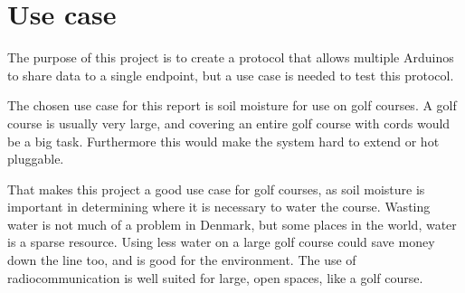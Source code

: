\section{Use case}
The purpose of this project is to create a protocol that allows multiple Arduinos to share data to a single endpoint, but a use case is needed to test this protocol.

The chosen use case for this report is soil moisture for use on golf courses. A golf course is usually very large, and covering an entire golf course with cords would be a big task. Furthermore this would make the system hard to extend or hot pluggable.

That makes this project a good use case for golf courses, as soil moisture is important in determining where it is necessary to water the course. Wasting water is not much of a problem in Denmark, but some places in the world, water is a sparse resource. Using less water on a large golf course could save money down the line too, and is good for the environment. The use of radiocommunication is well suited for large, open spaces, like a golf course.